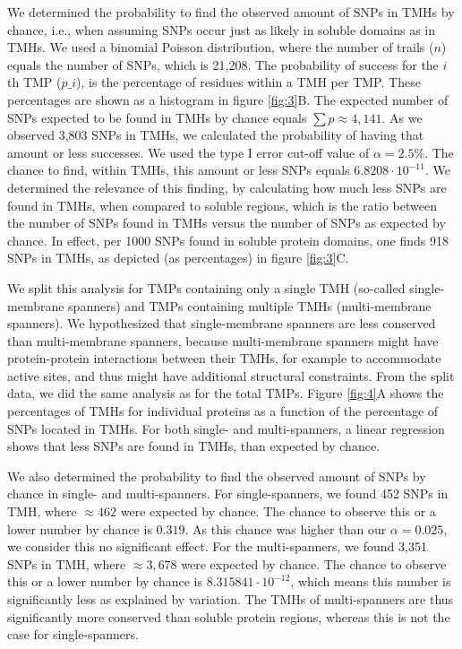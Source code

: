 \documentclass[utf8]{frontiersSCNS} %
\begin{document}
We determined the probability to find the observed amount
of SNPs in TMHs by chance, i.e., when assuming SNPs occur 
just as likely in soluble domains as in TMHs.
We used a binomial Poisson distribution, 
where the number of trails ($n$) equals the number of SNPs, 
which is 21,208. 
The probability of success for the $i$th TMP ($p\_i$), 
is the percentage of residues within a TMH per TMP. 
These percentages are shown as a histogram 
in figure \ref{fig:3}B. 
The expected number of SNPs expected to be found in 
TMHs by chance equals $\sum{p} \approx 4,141$.
As we observed 3,803 SNPs in TMHs, 
we calculated the probability of having that amount or less successes.
We used the type I error cut-off value of $\alpha = 2.5\%$.
The chance to find, within TMHs, this amount or less SNPs 
equals $6.8208 \cdot 10^{-11}$.
We determined the relevance of this finding, by
calculating how much less SNPs are found in TMHs,
when compared to soluble regions, which is the
ratio between the number of SNPs found in TMHs
versus the number of SNPs as expected by chance.
In effect, per 1000 SNPs found in soluble protein domains, 
one finds 918 SNPs in TMHs,
as depicted (as percentages) in figure \ref{fig:3}C. 

We split this analysis for TMPs containing only a single TMH (so-called single-membrane spanners) and TMPs containing multiple TMHs (multi-membrane spanners). 
We hypothesized that single-membrane spanners are less conserved than multi-membrane spanners,
because multi-membrane spanners
might have protein-protein interactions between their TMHs, 
for example to accommodate active sites, and 
thus might have additional structural constraints.
From the split data, we did the same analysis as for the total TMPs.
Figure \ref{fig:4}A 
shows the percentages of TMHs for individual proteins as a function of the
percentage of SNPs located in TMHs.
For both single- and multi-spanners, a linear regression shows that less
SNPs are found in TMHs, than expected by chance.

We also determined the probability to find the 
observed amount of SNPs  by chance in single- and multi-spanners.
For single-spanners, we found 452 SNPs in TMH, where
$\approx462$ were expected by chance. 
The chance to observe this or a lower number by chance is 
$0.319$. As this chance was higher than our $\alpha = 0.025$,
we consider this no significant effect.
For the multi-spanners, we found 3,351 SNPs in TMH, where 
$\approx3,678$ were expected by chance. 
The chance to observe this or a lower number by chance is 
$8.315841 \cdot 10^{-12}$, 
which means this number is significantly less as explained by variation. The TMHs of multi-spanners are thus significantly more conserved than soluble protein regions, whereas this is not the case for single-spanners.
\end{document}
